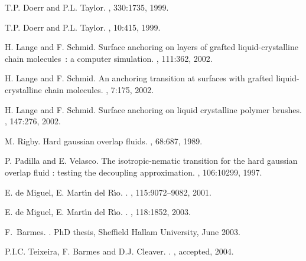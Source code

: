 \documentclass[aps,10pt,twocolumn]{revtex4}
\begin{document}
\begin{thebibliography}{10}
{T.P. Doerr and P.L. Taylor}.
, 330:1735, 1999.

{T.P. Doerr and P.L. Taylor}.
, 10:415, 1999.

{H. Lange and F. Schmid}.
\newblock Surface anchoring on layers of grafted liquid-crystalline chain
  molecules~: a computer simulation.
, 111:362, 2002.

{H. Lange and F. Schmid}.
\newblock An anchoring transition at surfaces with grafted liquid-crystalline
  chain molecules.
, 7:175, 2002.

{H. Lange and F. Schmid}.
\newblock Surface anchoring on liquid crystalline polymer brushes.
, 147:276, 2002.

{M. Rigby}.
\newblock Hard gaussian overlap fluids.
, 68:687, 1989.

{P. Padilla and E. Velasco}.
\newblock The isotropic-nematic transition for the hard gaussian overlap fluid
  : testing the decoupling approximation.
, 106:10299, 1997.

{E. de Miguel, E. Mart\'{\i}n del R\'{\i}o}.
.
, 115:9072--9082, 2001.

{E. de Miguel, E. Mart\'{\i}n del R\'{\i}o}.
.
, 118:1852, 2003.

F.~Barmes.
.
\newblock PhD thesis, Sheffield Hallam University, June 2003.

{P.I.C. Teixeira, F. Barmes and D.J. Cleaver}.
.
, accepted, 2004.


\end{thebibliography}
\end{document}

